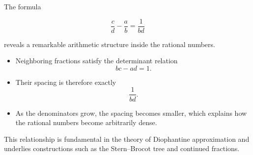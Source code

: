 \begin{remark}
The formula

\[
\frac{c}{d}-\frac{a}{b}=\frac{1}{bd}
\]

reveals a remarkable arithmetic structure inside the rational numbers.

\begin{itemize}
\item Neighboring fractions satisfy the determinant relation
\[
bc-ad=1.
\]

\item Their spacing is therefore exactly
\[
\frac{1}{bd}.
\]

\item As the denominators grow, the spacing becomes smaller, which
explains how the rational numbers become arbitrarily dense.
\end{itemize}

This relationship is fundamental in the theory of Diophantine
approximation and underlies constructions such as the
Stern–Brocot tree and continued fractions.
\end{remark}


